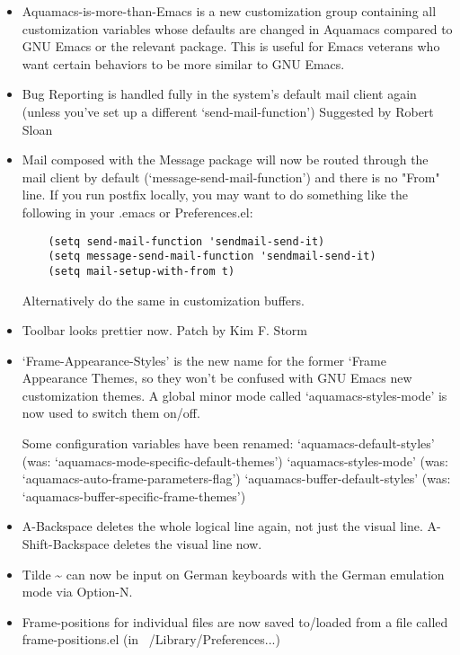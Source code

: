 \begin{itemize}
\item  Aquamacs-is-more-than-Emacs is a new customization group
	containing all customization variables whose defaults are changed
	in Aquamacs compared to GNU Emacs or the relevant package.
	This is useful for Emacs veterans who want certain behaviors to be
	more similar to GNU Emacs.

\item  Bug Reporting is handled fully in the system's default mail
	client again (unless you've set up a different
	`send-mail-function')
	Suggested by Robert Sloan

\item  Mail composed with the Message package will now be routed
	through the mail client by default (`message-send-mail-function')
	and there is no "From" line. If you run postfix locally, you may
	want to do something like the following in your .emacs or Preferences.el:

\begin{verbatim}
	(setq send-mail-function 'sendmail-send-it)
	(setq message-send-mail-function 'sendmail-send-it)
	(setq mail-setup-with-from t)
\end{verbatim}

	Alternatively do the same in customization buffers.	

\item  Toolbar looks prettier now.
	Patch by Kim F. Storm
	
\item  `Frame-Appearance-Styles' is the new name for the former `Frame
	Appearance Themes, so they won't be confused with GNU Emacs new
	customization themes. A global minor mode called
	`aquamacs-styles-mode' is now used to switch them on/off.

	Some configuration variables have been renamed: 
	`aquamacs-default-styles' 
	       (was: `aquamacs-mode-specific-default-themes')
	`aquamacs-styles-mode' 
	       (was: `aquamacs-auto-frame-parameters-flag')
	`aquamacs-buffer-default-styles' 
	       (was: `aquamacs-buffer-specific-frame-themes')

\item  A-Backspace deletes the whole logical line again, not just
	the visual line. A-Shift-Backspace deletes the visual line now.

\item  Tilde {\textasciitilde{}} can now be input on German keyboards with the German
	emulation mode via Option-N.

\item  Frame-positions for individual files are now saved to/loaded
	from a file called frame-positions.el (in ~/Library/Preferences...)
	


\end{itemize}
